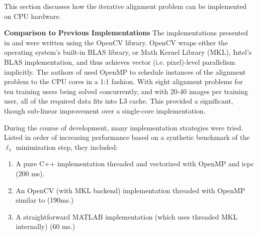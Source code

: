 \documentclass[10pt,twocolumn,letterpaper]{article}
\begin{document}
This section discusses how the iterative alignment problem can be implemented
on CPU hardware.  

{\bf Comparison to Previous Implementations}
The implementations presented in \cite{WagnerA2009-CVPR} and
\cite{WagnerA2011-PAMI} were written using the OpenCV library.  OpenCV wraps
either the operating system's built-in BLAS library, or Math Kernel Library
(MKL), Intel's BLAS implementation, and thus achieves vector (i.e. pixel)-level
parallelism implicitly.  The authors of \cite{WagnerA2011-PAMI} used OpenMP to
schedule instances of the alignment problem to the CPU cores in a 1:1 fashion.
With eight alignment problems for ten training users being solved concurrently,
and with 20-40 images per training user, all of the required data fits into L3
cache.  This provided a significant, though sub-linear improvement over a
single-core implementation.

During the course of development, many implementation strategies were tried.
Listed in order of increasing performance based on a synthetic benchmark of
the $\ell_1$ minimization step, they included:
\begin{enumerate}
\item A pure C++ implementation threaded and vectorized with OpenMP and icpc (200 ms).
\item An OpenCV (with MKL backend) implementation threaded with OpenMP similar to \cite{WagnerA2011-PAMI} (190ms.)
\item A straightforward MATLAB implementation (which uses threaded MKL internally) (60 ms.)
\end{enumerate}



\end{document}
